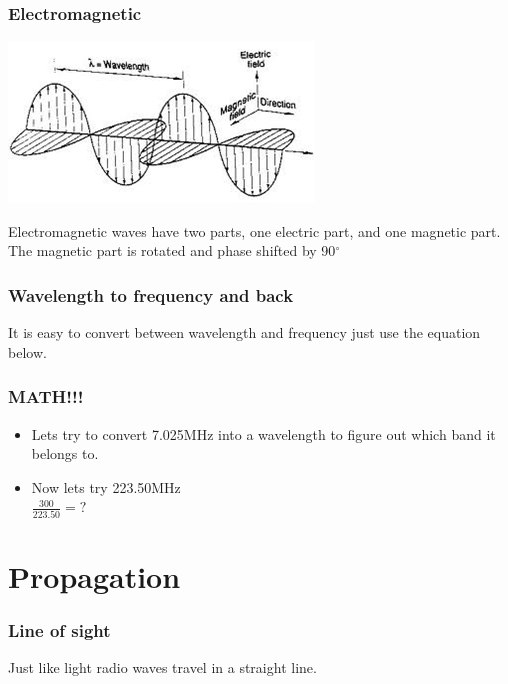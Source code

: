 \documentclass[10pt, handout]{beamer}
\begin{document}
\begin{frame}
\frametitle{Electromagnetic}
\begin{center}
\includegraphics[height=0.5\textheight]{emwave.png}\\
\end{center}
Electromagnetic waves have two parts, one electric part, and one magnetic part. The magnetic part is rotated and phase shifted by 90$^{\circ}$
\end{frame}

\begin{frame}
\frametitle{Wavelength to frequency and back}
It is easy to convert between wavelength and frequency just use the equation below.\\
\end{frame}

\begin{frame}
\frametitle{MATH!!!}
\begin{itemize}
\item Lets try to convert 7.025MHz into a wavelength to figure out which band it belongs to.\\
 
\item<5-> Now lets try 223.50MHz\\
$\frac{300}{223.50}=?$ 
\end{itemize}
\end{frame}

\section{Propagation}

\begin{frame}
\frametitle{Line of sight}
Just like light radio waves travel in a straight line.\\
\end{frame}
\end{document}
